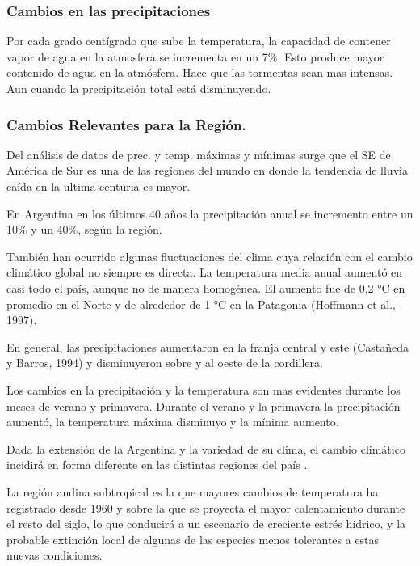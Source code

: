 \documentclass[
  a4paper,12pt]{extarticle}
\begin{document}
\hypertarget{cambios-en-las-precipitaciones}{%
\subsubsection{Cambios en las
precipitaciones}\label{cambios-en-las-precipitaciones}}

Por cada grado centígrado que sube la temperatura, la capacidad de
contener vapor de agua en la atmosfera se incrementa en un 7\%. Esto
produce mayor contenido de agua en la atmósfera. Hace que las tormentas
sean mas intensas. Aun cuando la precipitación total está disminuyendo.

\hypertarget{cambios-relevantes-para-la-regiuxf3n.}{%
\subsubsection{Cambios Relevantes para la
Región.}\label{cambios-relevantes-para-la-regiuxf3n.}}

Del análisis de datos de prec. y temp. máximas y mínimas surge que el SE
de América de Sur es una de las regiones del mundo en donde la tendencia
de lluvia caída en la ultima centuria es mayor.

En Argentina en los últimos 40 años la precipitación anual se incremento
entre un 10\% y un 40\%, según la región.

También han ocurrido algunas fluctuaciones del clima cuya relación con
el cambio climático global no siempre es directa. La temperatura media
anual aumentó en casi todo el país, aunque no de manera homogénea. El
aumento fue de 0,2 °C en promedio en el Norte y de alrededor de 1 °C en
la Patagonia (Hoffmann et al., 1997).

En general, las precipitaciones aumentaron en la franja central y este
(Castañeda y Barros, 1994) y disminuyeron sobre y al oeste de la
cordillera.

Los cambios en la precipitación y la temperatura son mas evidentes
durante los meses de verano y primavera. Durante el verano y la
primavera la precipitación aumentó, la temperatura máxima disminuyo y la
mínima aumento.

Dada la extensión de la Argentina y la variedad de su clima, el cambio
climático incidirá en forma diferente en las distintas regiones del país
.

La región andina subtropical es la que mayores cambios de temperatura ha
registrado desde 1960 y sobre la que se proyecta el mayor calentamiento
durante el resto del siglo, lo que conducirá a un escenario de creciente
estrés hídrico, y la probable extinción local de algunas de las especies
menos tolerantes a estas nuevas condiciones.
\end{document}
